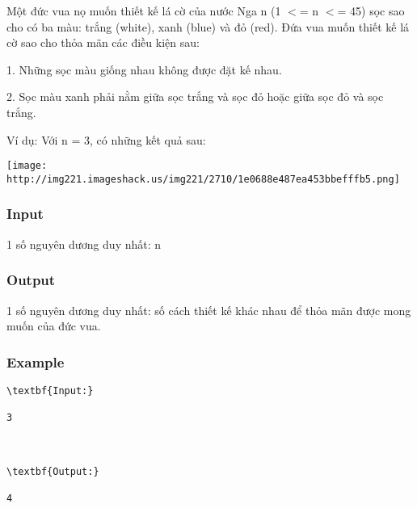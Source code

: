 

Một đức vua nọ muốn thiết kế lá cờ của nước Nga n (1 $<$= n $<$= 45) sọc sao cho có ba màu: trắng (white), xanh (blue) và đỏ (red). Đứa vua muốn thiết kế lá cờ sao cho thỏa mãn các điều kiện sau:

1. Những sọc màu giống nhau không được đặt kế nhau.

2. Sọc màu xanh phải nằm giữa sọc trắng và sọc đỏ hoặc giữa sọc đỏ và sọc trắng.

Ví dụ: Với n = 3, có những kết quả sau:


\texttt{[image: http://img221.imageshack.us/img221/2710/1e0688e487ea453bbefffb5.png]}

\subsubsection{Input}

1 số nguyên dương duy nhất: n

\subsubsection{Output}

1 số nguyên dương duy nhất: số cách thiết kế khác nhau để thỏa mãn được mong muốn của đức vua.

\subsubsection{Example}
\begin{verbatim}
\textbf{Input:}

3



\textbf{Output:}

4

\end{verbatim}